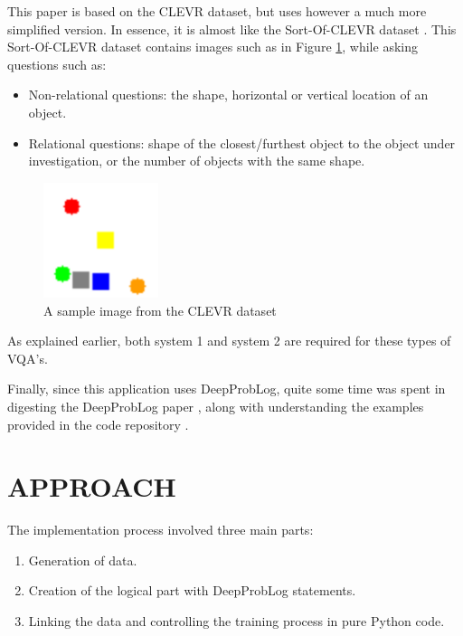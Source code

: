 \documentclass[english]{sobraep}
\begin{document}
This paper is based on the CLEVR dataset, but uses however a much more simplified version. In essence, it is almost like the Sort-Of-CLEVR dataset \cite{sort_of_clevr_dataset}. This Sort-Of-CLEVR dataset contains images such as in Figure \ref{fig:sample_image_sort_of_clevr}, while asking questions such as:
\begin{itemize}
    \item Non-relational questions: the shape, horizontal or vertical location of an object.
    \item Relational questions: shape of the closest/furthest object to the object under investigation, or the number of objects with the same shape.
\end{itemize}

\begin{figure}[H]
    \begin{center}
    \includegraphics[width=0.3\textwidth]{sort_of_clevr.png}
    \captionsetup{justification=centering}
    \caption{A sample image from the CLEVR dataset \cite{sort_of_clevr_dataset}}
    \label{fig:sample_image_sort_of_clevr}
    \end{center}
\end{figure}

As explained earlier, both system 1 and system 2 are required for these types of VQA's.

Finally, since this application uses DeepProbLog, quite some time was spent in digesting the DeepProbLog paper \cite{deepproblog}, along with understanding the  examples provided in the code repository \cite{deepproblog_code}.

\section{APPROACH}
\label{sec:approach}
The implementation process involved three main parts:
\begin{enumerate}
    \item Generation of data.
    \item Creation of the logical part with DeepProbLog statements.
    \item Linking the data and controlling the training process in pure Python code.
\end{enumerate}
\end{document}
